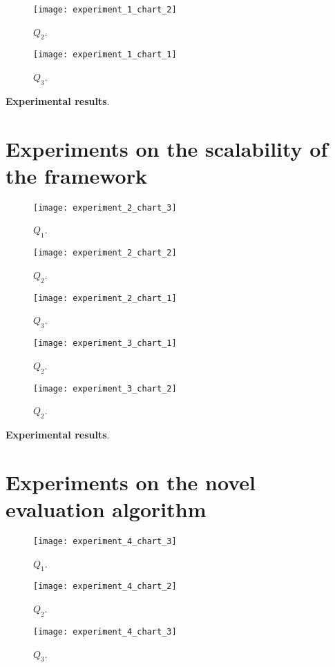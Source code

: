\begin{figure}[H]
  \centering
  \texttt{[image: experiment\_1\_chart\_2]}
  \caption{$Q_{2}$.}
  \label{fig:???}
\end{figure}

\begin{figure}[H]
  \centering
  \texttt{[image: experiment\_1\_chart\_1]}
  \caption{$Q_{3}$.}
  \label{fig:???}
\end{figure}


\textbf{Experimental results}.

\section{Experiments on the scalability of the framework}\label{sec:scalability}

\begin{figure}[H]
  \centering
  \texttt{[image: experiment\_2\_chart\_3]}
  \caption{$Q_{1}$.}
  \label{fig:???}
\end{figure}

\begin{figure}[H]
  \centering
  \texttt{[image: experiment\_2\_chart\_2]}
  \caption{$Q_{2}$.}
  \label{fig:???}
\end{figure}

\begin{figure}[H]
  \centering
  \texttt{[image: experiment\_2\_chart\_1]}
  \caption{$Q_{3}$.}
  \label{fig:???}
\end{figure}



\begin{figure}[H]
  \centering
  \texttt{[image: experiment\_3\_chart\_1]}
  \caption{$Q_{2}$.}
  \label{fig:???}
\end{figure}

\begin{figure}[H]
  \centering
  \texttt{[image: experiment\_3\_chart\_2]}
  \caption{$Q_{2}$.}
  \label{fig:???}
\end{figure}

\textbf{Experimental results}.

\section{Experiments on the novel evaluation algorithm}\label{sec:new-algorithm}

\begin{figure}[H]
  \centering
  \texttt{[image: experiment\_4\_chart\_3]}
  \caption{$Q_{1}$.}
  \label{fig:???}
\end{figure}
\begin{figure}[H]
  \centering
  \texttt{[image: experiment\_4\_chart\_2]}
  \caption{$Q_{2}$.}
  \label{fig:???}
\end{figure}
\begin{figure}[H]
  \centering
  \texttt{[image: experiment\_4\_chart\_3]}
  \caption{$Q_{3}$.}
  \label{fig:???}
\end{figure}


